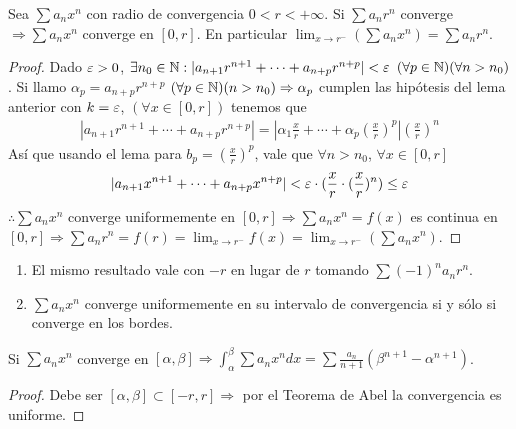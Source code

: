 \begin{theorem}[Abel]
  Sea $\sum a_n x^n$ con radio de convergencia $0 < r < +\infty$. Si $\sum a_n r^n$ converge $\Rightarrow \sum a_n x^n$ converge en $[0, r]$. En particular $\lim_{x \to r^-} (\sum a_n x^n) = \sum a_n r^n$.
  \begin{proof}
    Dado $\varepsilon > 0$, $\exists n_0 \in \mathbb{N} : |a_{n+1} r^{n+1} + \cdots + a_{n+p} r^{n+p}| < \varepsilon$ $(\forall p \in \mathbb{N}) (\forall n > n_0)$. Si llamo $\alpha_p = a_{n+p} r^{n+p}$ $(\forall p \in \mathbb{N})(n > n_0) \Rightarrow \alpha_p$
    cumplen las hipótesis del lema anterior con $k = \varepsilon$, $(\forall x \in [0, r])$ tenemos que \begin{align*}
      |a_{n+1} r^{n+1} + \cdots + a_{n+p} r^{n+p}| = |\alpha_1 \frac{x}{r} + \cdots + \alpha_p (\frac{x}{r})^p| (\frac{x}{r})^n
    \end{align*} Así que usando el lema para $b_p = (\frac{x}{r})^p$, vale que $\forall n > n_0$, $\forall x \in [0, r]$
    \begin{align*}
      |a_{n+1} x^{n+1} + \cdots + a_{n + p} x^{n+p}| < \varepsilon \cdot (\frac{x}{r} \cdot (\frac{x}{r})^n) \leq \varepsilon
    \end{align*} $\therefore \sum a_n x^n$ converge uniformemente en $[0, r] \Rightarrow \sum a_n x^n = f(x)$ es continua en $[0, r] \Rightarrow \sum a_n r^n = f(r) = \lim_{x \to r^-} f(x) = \lim_{x \to r^-} (\sum a_n x^n)$.
  \end{proof}
\end{theorem}

\begin{note}
  \begin{enumerate}
    \item El mismo resultado vale con $-r$ en lugar de $r$ tomando $\sum (-1)^n a_n r^n$.
    \item $\sum a_n x^n$ converge uniformemente en su intervalo de convergencia si y sólo si converge en los bordes.
  \end{enumerate}
\end{note}

\begin{theorem}
  Si $\sum a_n x^n$ converge en $[\alpha, \beta] \Rightarrow \int_{\alpha}^{\beta} \sum a_n x^n dx = \sum \frac{a_n}{n+1} (\beta^{n+1} - \alpha^{n+1})$.
  \begin{proof}
    Debe ser $[\alpha, \beta] \subset [-r, r] \Rightarrow$ por el Teorema de Abel la convergencia es uniforme.
  \end{proof}
\end{theorem}

